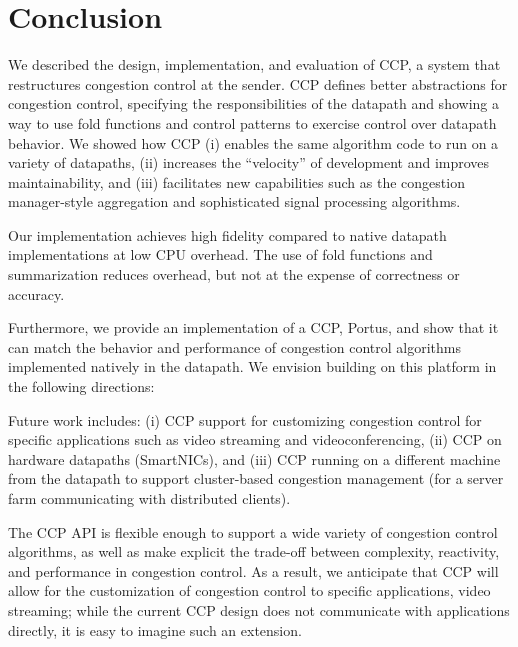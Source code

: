 \section{Conclusion}
\label{s:concl}

We described the design, implementation, and evaluation of CCP, a system that restructures congestion control at the sender. CCP defines better abstractions for congestion control, specifying the responsibilities of the datapath and showing a way to use fold functions and control patterns to exercise control over datapath behavior. We showed how CCP (i) enables the same algorithm code to run on a variety of datapaths, (ii) increases the ``velocity'' of development and improves maintainability, and (iii) facilitates new capabilities such as the congestion manager-style aggregation and sophisticated signal processing algorithms. 

Our implementation achieves high fidelity compared to native datapath implementations at low CPU overhead. The use of fold functions and summarization reduces overhead, but not at the expense of correctness or accuracy.

Furthermore, we provide an implementation of a CCP, Portus, and show that it can match the behavior and performance of congestion control algorithms implemented natively in the datapath. We envision building on this platform in the following directions:

\fi

Future work includes: (i) CCP support for customizing congestion control for specific applications such as video streaming and videoconferencing, (ii) CCP on hardware datapaths (\eg SmartNICs), and (iii) CCP running on a different machine from the datapath to support cluster-based congestion management (\eg for a server farm communicating with distributed clients).


 The CCP API is flexible enough to support a wide variety of congestion control algorithms, as well as make explicit the trade-off between complexity, reactivity, and performance in congestion control.
As a result, we anticipate that CCP will allow for the customization of congestion control to specific applications, \eg video streaming; while the current CCP design does not communicate with applications directly, it is easy to imagine such an extension.

\fi

